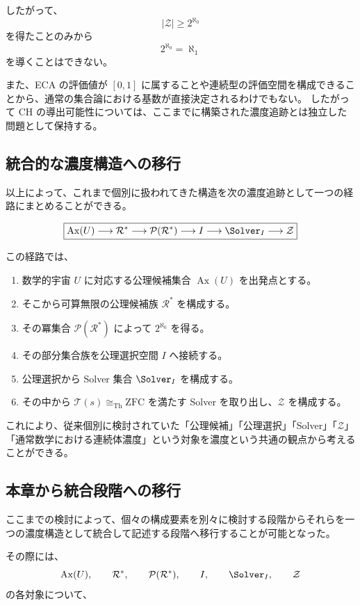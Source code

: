 \documentclass[a4paper,11pt]{article}
\begin{document}
したがって、
\[
|\mathcal{Z}|\geq2^{\aleph_0}
\]
を得たことのみから
\[
2^{\aleph_0}=\aleph_1
\]
を導くことはできない。

また、ECA の評価値が $[0,1]$ に属することや連続型の評価空間を構成できることから、通常の集合論における基数が直接決定されるわけでもない。
したがって CH の導出可能性については、ここまでに構築された濃度追跡とは独立した問題として保持する。

\subsection{統合的な濃度構造への移行}
以上によって、これまで個別に扱われてきた構造を次の濃度追跡として一つの経路にまとめることができる。

\[
\boxed{
\operatorname{Ax}(U)
\longrightarrow
\mathcal{R}^*
\longrightarrow
\mathcal{P}(\mathcal{R}^*)
\longrightarrow
I
\longrightarrow
\Solver_I
\longrightarrow
\mathcal{Z}
}
\]

この経路では、

\begin{enumerate}
\item 数学的宇宙 $U$ に対応する公理候補集合 $\operatorname{Ax}(U)$ を出発点とする。
\item そこから可算無限の公理候補族 $\mathcal{R}^*$ を構成する。
\item その冪集合 $\mathcal{P}(\mathcal{R}^*)$ によって $2^{\aleph_0}$ を得る。
\item その部分集合族を公理選択空間 $I$ へ接続する。
\item 公理選択から Solver 集合 $\Solver_I$ を構成する。
\item その中から $\mathcal{T}(s)\cong_{\mathrm{Th}}\mathrm{ZFC}$ を満たす Solver を取り出し、$\mathcal{Z}$ を構成する。
\end{enumerate}

これにより、従来個別に検討されていた「公理候補」「公理選択」「Solver」「$\mathcal{Z}$」「通常数学における連続体濃度」という対象を濃度という共通の観点から考えることができる。

\subsection{本章から統合段階への移行}
ここまでの検討によって、個々の構成要素を別々に検討する段階からそれらを一つの濃度構造として統合して記述する段階へ移行することが可能となった。

その際には、
\[
\operatorname{Ax}(U),
\qquad
\mathcal{R}^*,
\qquad
\mathcal{P}(\mathcal{R}^*),
\qquad
I,
\qquad
\Solver_I,
\qquad
\mathcal{Z}
\]
の各対象について、
\end{document}
